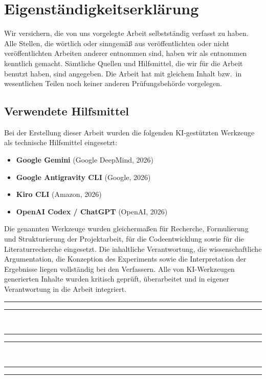 \chapter*{Eigenständigkeitserklärung}
%
Wir versichern, die von uns vorgelegte Arbeit selbstständig verfasst zu haben.
Alle Stellen, die wörtlich oder sinngemäß aus veröffentlichten oder nicht veröffentlichten Arbeiten anderer entnommen sind, haben wir als entnommen kenntlich gemacht.
Sämtliche Quellen und Hilfsmittel, die wir für die Arbeit benutzt haben, sind angegeben.
Die Arbeit hat mit gleichem Inhalt bzw.\ in wesentlichen Teilen noch keiner anderen Prüfungsbehörde vorgelegen.
%
\section*{Verwendete Hilfsmittel}
%
Bei der Erstellung dieser Arbeit wurden die folgenden KI-gestützten Werkzeuge als technische Hilfsmittel eingesetzt:
%
\begin{itemize}
  \item \textbf{Google Gemini} (Google DeepMind, 2026)
  \item \textbf{Google Antigravity CLI} (Google, 2026)
  \item \textbf{Kiro CLI} (Amazon, 2026)
  \item \textbf{OpenAI Codex / ChatGPT} (OpenAI, 2026)
\end{itemize}
%
Die genannten Werkzeuge wurden gleichermaßen für Recherche, Formulierung und Strukturierung der Projektarbeit, für die Codeentwicklung sowie für die Literaturrecherche eingesetzt.
Die inhaltliche Verantwortung, die wissenschaftliche Argumentation, die Konzeption des Experiments sowie die Interpretation der Ergebnisse liegen vollständig bei den Verfassern.
Alle von KI-Werkzeugen generierten Inhalte wurden kritisch geprüft, überarbeitet und in eigener Verantwortung in die Arbeit integriert.
%
\par\vspace{\fill}
%
\noindent\begin{minipage}{\textwidth}
\vspace{1.5cm}
\noindent\rule{0.38\textwidth}{0.4pt}\hfill\rule{0.5\textwidth}{0.4pt}\\[2pt]
\noindent{}\hfill{}

\vspace{1cm}

\noindent\rule{0.38\textwidth}{0.4pt}\hfill\rule{0.5\textwidth}{0.4pt}\\[2pt]
\noindent{}\hfill{}

\vspace{1cm}

\noindent\rule{0.38\textwidth}{0.4pt}\hfill\rule{0.5\textwidth}{0.4pt}\\[2pt]
\noindent{}\hfill{}
\end{minipage}
